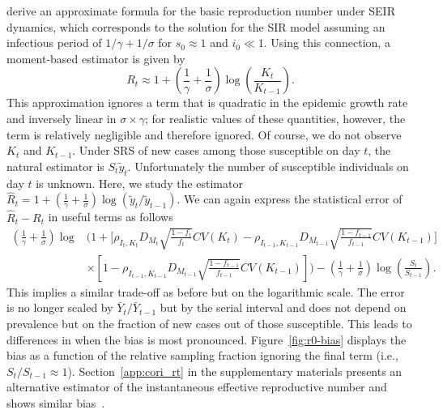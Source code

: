 \documentclass[11pt]{amsart}
\numberwithin{equation}{section}
\theoremstyle{plain}
\begin{document}
\cite{Heng2020} derive an approximate formula for the basic reproduction number under SEIR dynamics, which corresponds to the solution for the SIR model assuming an infectious period of $1/\gamma + 1/\sigma$ for $s_0 \approx 1$ and $i_0 \ll 1$. Using this connection, a moment-based estimator is given by
$$
R_t \approx 1 + \left( \frac{1}{\gamma} + \frac{1}{\sigma} \right) \log \left( \frac{K_t}{K_{t-1}} \right).
$$
This approximation ignores a term that is quadratic in the epidemic growth rate and inversely linear in $\sigma \times \gamma$; for realistic values of these quantities, however, the term is relatively negligible and therefore ignored. Of course, we do not observe $K_t$ and $K_{t-1}$.  Under SRS of new cases among those susceptible on day $t$, the natural estimator is $S_t \tilde y_t$.  Unfortunately the number of susceptible individuals on day $t$ is unknown. Here, we study the estimator $\hat R_t = 1 + \left( \frac{1}{\gamma} + \frac{1}{\sigma}\right) \log \left( \tilde y_t / \tilde y_{t-1} \right)$. We can again express the statistical error of $\hat R_t - R_t$ in useful terms as follows
 $$
 \begin{aligned}
 \left( \frac{1}{\gamma} + \frac{1}{\sigma} \right)\log &\bigg( 1 + \bigg[ \rho_{I_t,K_t} D_{M_t} \sqrt{\frac{1-f_t}{f_t}} CV (K_t)  -\rho_{I_{t-1},K_{t-1}} D_{M_{t-1}} \sqrt{\frac{1-f_{t-1}}{f_{t-1}}} CV (K_{t-1}) \bigg] \\
 &\times \left[ 1 - \rho_{I_{t-1},K_{t-1}} D_{M_{t-1}} \sqrt{\frac{1-f_{t-1}}{f_{t-1}}} CV (K_{t-1}) \right] \bigg) - \left( \frac{1}{\gamma} + \frac{1}{\sigma} \right) \log \left( \frac{S_t}{S_{t-1}} \right).
 \end{aligned}
 $$
 This implies a similar trade-off as before but on the logarithmic scale.  The error is no longer scaled by $\bar Y_t/\bar Y_{t-1}$ but by the serial interval and does not depend on prevalence but on the fraction of new cases out of those susceptible. This leads to differences in when the bias is most pronounced. Figure~\ref{fig:r0-bias} displays the bias as a function of the relative sampling fraction ignoring the final term (i.e., $S_t / S_{t-1} \approx 1$). Section~\ref{app:cori_rt} in the supplementary materials presents an alternative estimator of the instantaneous effective reproductive number and shows similar bias~\cite{Cori20113}.


\end{document}
